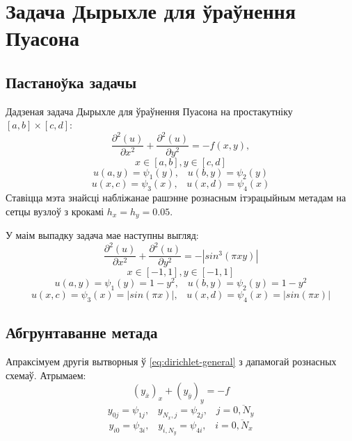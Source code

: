 \section{Задача Дырыхле для ўраўнення Пуасона}

\subsection*{Пастаноўка задачы}
Дадзеная задача Дырыхле для ўраўнення Пуасона на простакутніку $[a,b]\times[c,d]$:
\begin{equation} \label{eq:dirichlet-general}
    \frac{\partial^2(u)}{\partial x^2} + \frac{\partial^2(u)}{\partial y^2} = -f(x,y),
\end{equation}
\[ x \in [a, b], y \in [c, d] \]
\[ u(a, y) = \psi_1(y), \hspace{10pt} u(b, y) = \psi_2(y) \]
\[ u(x, c) = \psi_3(x), \hspace{10pt} u(x, d) = \psi_4(x) \]
Ставіцца мэта знайсці набліжанае рашэнне рознасным ітэрацыйным метадам на сетцы вузлоў з крокамі $h_x = h_y = 0.05$.\par
\vspace{5mm}
У маім выпадку задача мае наступны выгляд:
\begin{equation}
    \frac{\partial^2(u)}{\partial x^2} + \frac{\partial^2(u)}{\partial y^2} = - | sin^3(\pi x y) |
\end{equation}
\[ x \in [-1, 1], y \in [-1, 1] \]
\[ u(a, y) = \psi_1(y) = 1 - y^2, \hspace{10pt} u(b, y) = \psi_2(y) = 1 - y^2 \]
\[ u(x, c) = \psi_3(x) = |sin(\pi x)|, \hspace{10pt} u(x, d) = \psi_4(x) = |sin(\pi x)| \]


\subsection*{Абгрунтаванне метада}

Апраксімуем другія вытворныя ў \eqref{eq:dirichlet-general} з дапамогай рознасных схемаў. Атрымаем:
\begin{equation}
    (y_{\overline{x}})_{x} + (y_{\overline{y}})_{y} = -f
\end{equation}
\[ y_{0j} = \psi_{1j}, \hspace{10pt} y_{N_x,j} = \psi_{2j}, \hspace{10pt} j = \overline{0, N_y} \]
\[ y_{i0} = \psi_{3i}, \hspace{10pt} y_{i,N_y} = \psi_{4i}, \hspace{10pt} i = \overline{0, N_x} \]

